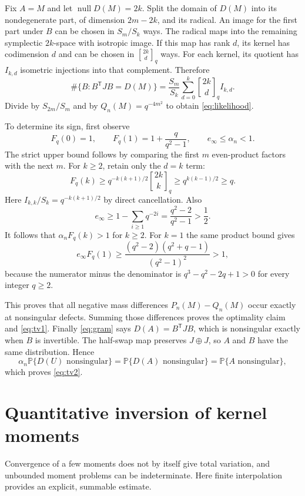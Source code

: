 \documentclass[11pt]{article}
\theoremstyle{definition}\newtheorem{definition}[theorem]{Definition}
\theoremstyle{remark}\newtheorem{remark}[theorem]{Remark}
\newcommand{\Prob}{\mathbb P}
\newcommand{\nul}{\operatorname{null}}
\newcommand{\gb}[2]{\genfrac{[}{]}{0pt}{}{#1}{#2}_{q}}
\newcommand{\1}{\mathbf 1}
\begin{document}
Fix $A=M$ and let $\nul D(M)=2k$. Split the domain of $D(M)$ into its
nondegenerate part, of dimension $2m-2k$, and its radical. An image for
the first part under $B$ can be chosen in $S_m/S_k$ ways. The radical
maps into the remaining symplectic $2k$-space with isotropic image. If
this map has rank $d$, its kernel has codimension $d$ and can be chosen
in $\gb{2k}{d}$ ways. For each kernel, its quotient has $I_{k,d}$
isometric injections into that complement. Therefore
\[
 \#\{B:B^{\mathsf T}JB=D(M)\}
  =\frac{S_m}{S_k}\sum_{d=0}^k\gb{2k}{d}I_{k,d}.
\]
Divide by $S_{2m}/S_m$ and by $Q_n(M)=q^{-4m^2}$ to obtain
\eqref{eq:likelihood}.

To determine its sign, first observe
\[
 F_q(0)=1,\qquad F_q(1)=1+\frac q{q^2-1},\qquad
 e_\infty\le\alpha_n<1.
\]
The strict upper bound follows by comparing the first $m$ even-product
factors with the next $m$. For $k\ge2$, retain only the $d=k$ term:
\begin{equation}\label{eq:Fbound}
 F_q(k)\ge q^{-k(k+1)/2}\gb{2k}{k}
       \ge q^{k(k-1)/2}\ge q.
\end{equation}
Here $I_{k,k}/S_k=q^{-k(k+1)/2}$ by direct cancellation. Also
\[
 e_\infty\ge 1-\sum_{i\ge1}q^{-2i}
   =\frac{q^2-2}{q^2-1}>\frac12.
\]
It follows that $\alpha_nF_q(k)>1$ for $k\ge2$. For $k=1$ the same
product bound gives
\[
 e_\infty F_q(1)\ge
 \frac{(q^2-2)(q^2+q-1)}{(q^2-1)^2}>1,
\]
because the numerator minus the denominator is
$q^3-q^2-2q+1>0$ for every integer $q\ge2$.

This proves that all negative mass differences $P_n(M)-Q_n(M)$ occur
exactly at nonsingular defects. Summing those differences proves the
optimality claim and \eqref{eq:tv1}. Finally \eqref{eq:gram} says
$D(A)=B^{\mathsf T}JB$, which is nonsingular exactly when $B$ is invertible.
The half-swap map preserves $J\oplus J$, so $A$ and $B$ have the same
distribution. Hence
\[
 \alpha_n\Prob\{D(U)\text{ nonsingular}\}
   =\Prob\{D(A)\text{ nonsingular}\}
   =\Prob\{A\text{ nonsingular}\},
\]
which proves \eqref{eq:tv2}.

\section{Quantitative inversion of kernel moments}\label{sec:inversion}

Convergence of a few moments does not by itself give total variation, and
unbounded moment problems can be indeterminate. Here finite interpolation
provides an explicit, summable estimate.
\end{document}
